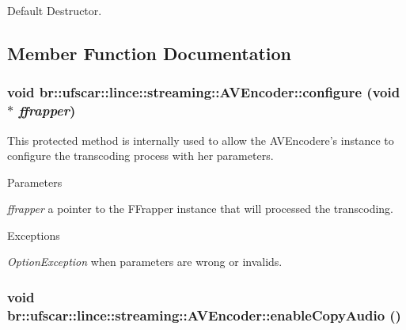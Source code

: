 Default Destructor. 



\subsection{Member Function Documentation}
\hypertarget{classbr_1_1ufscar_1_1lince_1_1streaming_1_1AVEncoder_abdda25898b06cfaf3f9271b847a8da24}{
\subsubsection[{configure}]{\setlength{\rightskip}{0pt plus 5cm}void br::ufscar::lince::streaming::AVEncoder::configure (void $\ast$ {\em ffrapper})}}
\label{classbr_1_1ufscar_1_1lince_1_1streaming_1_1AVEncoder_abdda25898b06cfaf3f9271b847a8da24}


This protected method is internally used to allow the AVEncodere's instance to configure the transcoding process with her parameters. 


\begin{DoxyParams}{Parameters}
\item[{\em ffrapper}]a pointer to the FFrapper instance that will processed the transcoding. \end{DoxyParams}

\begin{DoxyExceptions}{Exceptions}
\item[{\em OptionException}]when parameters are wrong or invalids. \end{DoxyExceptions}
\hypertarget{classbr_1_1ufscar_1_1lince_1_1streaming_1_1AVEncoder_a512c848e6cfd6a4464c529611c246ffe}{
\subsubsection[{enableCopyAudio}]{\setlength{\rightskip}{0pt plus 5cm}void br::ufscar::lince::streaming::AVEncoder::enableCopyAudio ()}}
\label{classbr_1_1ufscar_1_1lince_1_1streaming_1_1AVEncoder_a512c848e6cfd6a4464c529611c246ffe}


